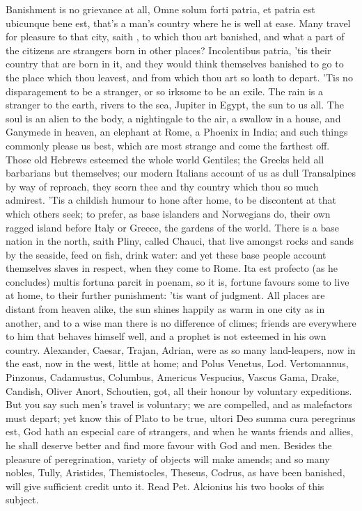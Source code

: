 {Banishment is no grievance at all, Omne solum forti patria, \etc{} et
patria est ubicunque bene est, that's a man's country where he is well
at ease. Many travel for pleasure to that city, saith \Seneca, to which
thou art banished, and what a part of the citizens are strangers born
in other places? Incolentibus patria, 'tis their country that are
born in it, and they would think themselves banished to go to the place
which thou leavest, and from which thou art so loath to depart. 'Tis no
disparagement to be a stranger, or so irksome to be an exile. The
rain is a stranger to the earth, rivers to the sea, Jupiter in Egypt,
the sun to us all. The soul is an alien to the body, a nightingale to
the air, a swallow in a house, and Ganymede in heaven, an elephant at
Rome, a Phoenix in India; and such things commonly please us best,
which are most strange and come the farthest off. Those old Hebrews
esteemed the whole world Gentiles; the Greeks held all barbarians but
themselves; our modern Italians account of us as dull Transalpines by
way of reproach, they scorn thee and thy country which thou so much
admirest. 'Tis a childish humour to hone after home, to be discontent
at that which others seek; to prefer, as base islanders and Norwegians
do, their own ragged island before Italy or Greece, the gardens of the
world. There is a base nation in the north, saith Pliny, called
Chauci, that live amongst rocks and sands by the seaside, feed on fish,
drink water: and yet these base people account themselves slaves in
respect, when they come to Rome. Ita est profecto (as he concludes)
multis fortuna parcit in poenam, so it is, fortune favours some to live
at home, to their further punishment: 'tis want of judgment. All places
are distant from heaven alike, the sun shines happily as warm in one
city as in another, and to a wise man there is no difference of climes;
friends are everywhere to him that behaves himself well, and a prophet
is not esteemed in his own country. Alexander, Caesar, Trajan, Adrian,
were as so many land-leapers, now in the east, now in the west, little
at home; and Polus Venetus, Lod. Vertomannus, Pinzonus, Cadamustus,
Columbus, Americus Vespucius, Vascus Gama, Drake, Candish, Oliver
Anort, Schoutien, got, all their honour by voluntary expeditions. But
you say such men's travel is voluntary; we are compelled, and as
malefactors must depart; yet know this of Plato to be true,
ultori Deo summa cura peregrinus est, God hath an especial care of
strangers, and when he wants friends and allies, he shall deserve
better and find more favour with God and men. Besides the pleasure of
peregrination, variety of objects will make amends; and so many nobles,
Tully, Aristides, Themistocles, Theseus, Codrus, \etc{} as have been
banished, will give sufficient credit unto it. Read Pet. Alcionius his
two books of this subject.

}
